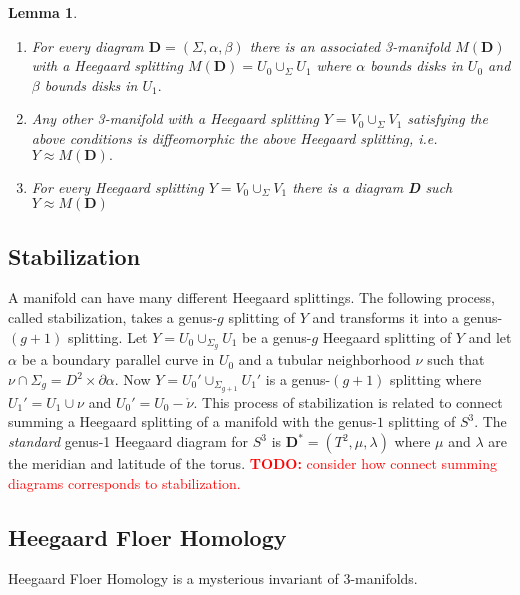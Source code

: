 \documentclass{amsart}
\def\todo#1{\textcolor{red}{\textbf{TODO: }{#1}}}
\newtheorem{lemma}[theorem]{Lemma}
\theoremstyle{definition}
\begin{document}
\begin{lemma} \hspace{2pt}\newline
\begin{enumerate}
\item For every diagram $\textbf{D} = (\Sigma, \alpha, \beta)$ there is an associated 3-manifold $M(\textbf{D})$ with a Heegaard splitting $M(\textbf{D}) = U_{0} \cup_{\Sigma} U_{1}$ where $\alpha$ bounds disks in $U_{0}$ and $\beta$ bounds disks in $U_{1}.$
\item Any other 3-manifold with a Heegaard splitting $Y = V_{0} \cup_{\Sigma} V_{1}$ satisfying the above conditions is diffeomorphic the above Heegaard splitting, i.e. $Y \approx M(\textbf{D}).$
\item  For every Heegaard splitting $Y = V_{0} \cup_{\Sigma} V_{1}$ there is a diagram \textbf{D} such $Y \approx M(\textbf{D})$
\end{enumerate}
\end{lemma}


\subsection{Stabilization}
A manifold can have many different Heegaard splittings. The following process, called stabilization, takes a genus-$g$ splitting of $Y$ and transforms it into a genus-$(g + 1)$ splitting. Let $Y = U_{0} \cup_{\Sigma_{g}} U_{1}$ be a genus-$g$ Heegaard splitting of $Y$ and let $\alpha$ be a boundary parallel curve in $U_{0}$ and a tubular neighborhood $\nu$ such that $\nu \cap \Sigma_{g} = D^{2} \times \partial \alpha.$ Now $Y = U_{0}' \cup_{\Sigma_{g + 1}} U_{1}'$ is a genus-$(g+1)$ splitting where $U_{1}' = U_{1} \cup \nu$ and $U_{0}' = U_{0} - \mathring{\nu}.$ \newline \newline This process of stabilization is related to connect summing a  Heegaard splitting of a manifold with the genus-$1$ splitting of $S^{3}.$  The \textit{standard} genus-1 Heegaard diagram for $S^{3}$ is $\textbf{D}^{*} = (T^{2}, \mu, \lambda)$ where        $\mu$ and $\lambda$ are the meridian and latitude of the torus. \todo{consider how connect summing diagrams corresponds to stabilization.}

\subsection{Heegaard Floer Homology}
Heegaard Floer Homology is a mysterious invariant of 3-manifolds.
\end{document}
